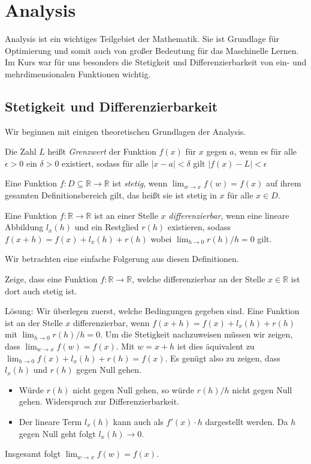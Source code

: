 \section{Analysis}

Analysis ist ein wichtiges Teilgebiet der Mathematik. Sie ist Grundlage für Optimierung und somit auch von großer Bedeutung für das Maschinelle Lernen. Im Kurs war für uns besonders die Stetigkeit und Differenzierbarkeit von ein- und mehrdimensionalen Funktionen wichtig.

\subsection{Stetigkeit und Differenzierbarkeit}

Wir beginnen mit einigen theoretischen Grundlagen der Analysis.
\begin{Def} Die Zahl $L$ heißt \emph{Grenzwert} der Funktion $f(x)$ für $x$ gegen $a$, wenn es für alle $\epsilon > 0$ ein $\delta > 0$ existiert, sodass für alle $|x-a| < \delta$ gilt $|f(x)-L|<\epsilon$
\end{Def}
\begin{Def}
Eine Funktion $f: D \subseteq \mathbb{R}\rightarrow \mathbb{R}$ ist \emph{stetig}, wenn $\lim_{w\rightarrow x}f(w)=f(x)$ auf ihrem gesamten Definitionsbereich gilt, das heißt sie ist stetig in $x$ für alle $x\in D$.
\end{Def}
\begin{Def}
Eine Funktion $f:\mathbb{R}\rightarrow \mathbb{R}$ ist an einer Stelle $x$ \emph{differenzierbar}, wenn eine lineare Abbildung $ l_ x (h)$ und ein Restglied $r(h)$ existieren, sodass $f(x+h)=f(x)+l_{x}(h)+r(h)$ wobei $\lim_{h\rightarrow 0} r(h)/h= 0$ gilt.
\end{Def}
Wir betrachten eine einfache Folgerung aus diesen Definitionen.

Zeige, dass eine Funktion $f:\mathbb{R} \rightarrow \mathbb{R}$, welche differenzierbar an der Stelle $x \in \mathbb{R}$ ist dort auch stetig ist.

Lösung: Wir überlegen zuerst, welche Bedingungen gegeben sind. Eine Funktion ist an der Stelle $x$ differenzierbar, wenn $f(x+h)=f(x)+l_x(h)+ r(h)$  
mit $\lim_{h \rightarrow 0} r(h)/h= 0$. Um die Stetigkeit nachzuweisen müssen wir zeigen, dass $\lim_{w \rightarrow x} f(w)=f(x)$. Mit $w = x+h$ ist dies äquivalent zu $\lim_{h \rightarrow 0} f(x)+l_x(h)+r(h)=f(x)$. Es genügt also zu zeigen, dass  $l_x(h)$ und $r(h)$ gegen Null gehen.
\begin{itemize}
  \item Würde $r(h)$ nicht gegen Null gehen, so würde $r(h)/h$ nicht gegen Null gehen. Widerspruch zur Differenzierbarkeit.
  \item Der lineare Term $l_x(h)$ kann auch als $f'(x) \cdot h$ dargestellt werden. Da $h$ gegen Null geht folgt $l_x(h)\rightarrow 0$.
\end{itemize}
Insgesamt folgt $\lim_{w\rightarrow x} f(w) = f(x)$.
